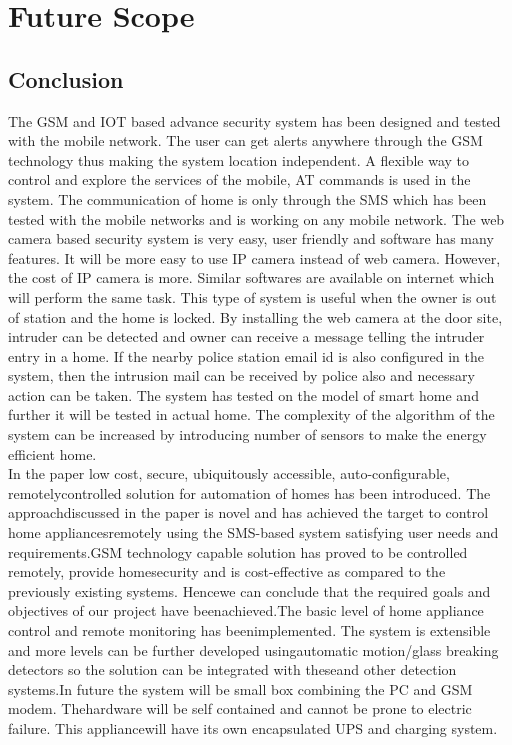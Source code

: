 \documentclass[twoside,a4paper,16pt]{book}
\begin{document}
{ \chapter{Future Scope}
 \section{Conclusion}
 The GSM and IOT based advance security system has been designed and tested with the mobile
 network. The user can get alerts anywhere through the GSM technology thus making the
 system location independent. A flexible way to control and explore the services of the mobile,
 AT commands is used in the system. The communication of home is only through the SMS
 which has been tested with the mobile networks and is working on any mobile network.
 The web camera based security system is very easy, user friendly and software has many
 features. It will be more easy to use IP camera instead of web camera. However, the cost of IP
 camera is more. Similar softwares are available on internet which will perform the same task.
 This type of system is useful when the owner is out of station and the home is locked. By
 installing the web camera at the door site, intruder can be detected and owner can receive a
 message telling the intruder entry in a home. If the nearby police station email id is also
 configured in the system, then the intrusion mail can be received by police also and necessary
 action can be taken.
 The system has tested on the model of smart home and further it will be tested in actual
 home. The complexity of the algorithm of the system can be increased by introducing number
 of sensors to make the energy efficient home.
\\
 In the paper low cost, secure, ubiquitously accessible, auto-configurable, remotelycontrolled solution for automation of homes has been introduced. The approachdiscussed in the paper is novel and has achieved the target to control home appliancesremotely using the SMS-based system satisfying user needs and requirements.GSM technology capable solution has proved to be controlled remotely, provide homesecurity and is cost-effective as compared to the previously existing systems. Hencewe can conclude that the required goals and objectives of our project have beenachieved.The basic level of home appliance control and remote monitoring has beenimplemented. The system is extensible and more levels can be further developed usingautomatic motion/glass breaking detectors so the solution can be integrated with theseand other detection systems.In future the system will be small box combining the PC and GSM modem. Thehardware will be self contained and cannot be prone to electric failure. This appliancewill have its own encapsulated UPS and charging system.
}
\end{document}
